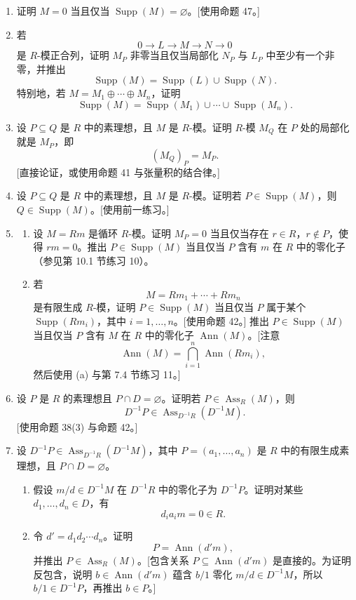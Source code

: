 \begin{enumerate}[label=\arabic*.,start=30]
	\item 证明 $M=0$ 当且仅当 $\operatorname{Supp}(M)=\varnothing$。[使用命题 47。]
	
	\item 若
	\[
	0\longrightarrow L\longrightarrow M\longrightarrow N\longrightarrow0
	\]
	是 $R$-模正合列，证明 $M_P$ 非零当且仅当局部化 $N_P$ 与 $L_P$ 中至少有一个非零，并推出
	\[
	\operatorname{Supp}(M)=\operatorname{Supp}(L)\cup\operatorname{Supp}(N).
	\]
	特别地，若 $M=M_1\oplus\cdots\oplus M_n$，证明
	\[
	\operatorname{Supp}(M)=\operatorname{Supp}(M_1)\cup\cdots\cup\operatorname{Supp}(M_n).
	\]
	
	\item 设 $P\subseteq Q$ 是 $R$ 中的素理想，且 $M$ 是 $R$-模。证明 $R$-模 $M_Q$ 在 $P$ 处的局部化就是 $M_P$，即
	\[
	(M_Q)_P=M_P.
	\]
	[直接论证，或使用命题 41 与张量积的结合律。]
	
	\item 设 $P\subseteq Q$ 是 $R$ 中的素理想，且 $M$ 是 $R$-模。证明若 $P\in\operatorname{Supp}(M)$，则 $Q\in\operatorname{Supp}(M)$。[使用前一练习。]
	
	\item
	\begin{enumerate}[label=(\alph*)]
		\item 设 $M=Rm$ 是循环 $R$-模。证明 $M_P=0$ 当且仅当存在 $r\in R$，$r\notin P$，使得 $rm=0$。推出 $P\in\operatorname{Supp}(M)$ 当且仅当 $P$ 含有 $m$ 在 $R$ 中的零化子（参见第 10.1 节练习 10）。
		\item 若
		\[
		M=Rm_1+\cdots+Rm_n
		\]
		是有限生成 $R$-模，证明 $P\in\operatorname{Supp}(M)$ 当且仅当 $P$ 属于某个 $\operatorname{Supp}(Rm_i)$，其中 $i=1,
		\ldots,n$。[使用命题 42。] 推出 $P\in\operatorname{Supp}(M)$ 当且仅当 $P$ 含有 $M$ 在 $R$ 中的零化子 $\operatorname{Ann}(M)$。[注意
		\[
		\operatorname{Ann}(M)=\bigcap_{i=1}^n\operatorname{Ann}(Rm_i),
		\]
		然后使用 (a) 与第 7.4 节练习 11。]
	\end{enumerate}
	
	\item 设 $P$ 是 $R$ 的素理想且 $P\cap D=\varnothing$。证明若 $P\in\operatorname{Ass}_R(M)$，则
	\[
	D^{-1}P\in\operatorname{Ass}_{D^{-1}R}(D^{-1}M).
	\]
	[使用命题 38(3) 与命题 42。]
	
	\item 设 $D^{-1}P\in\operatorname{Ass}_{D^{-1}R}(D^{-1}M)$，其中 $P=(a_1,
	\ldots,a_n)$ 是 $R$ 中的有限生成素理想，且 $P\cap D=\varnothing$。
	\begin{enumerate}[label=(\alph*)]
		\item 假设 $m/d\in D^{-1}M$ 在 $D^{-1}R$ 中的零化子为 $D^{-1}P$。证明对某些 $d_1,
		\ldots,d_n\in D$，有
		\[
		d_ia_im=0\in R.
		\]
		\item 令 $d'=d_1d_2\cdots d_n$。证明
		\[
		P=\operatorname{Ann}(d'm),
		\]
		并推出 $P\in\operatorname{Ass}_R(M)$。[包含关系 $P\subseteq\operatorname{Ann}(d'm)$ 是直接的。为证明反包含，说明 $b\in\operatorname{Ann}(d'm)$ 蕴含 $b/1$ 零化 $m/d\in D^{-1}M$，所以 $b/1\in D^{-1}P$，再推出 $b\in P$。]
	\end{enumerate}
	

\end{enumerate}
